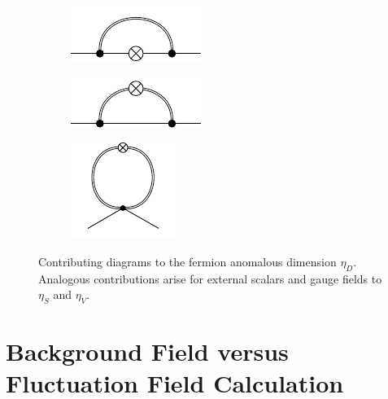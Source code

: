  
  \begin{figure}[t]
 \centering
 \hfill
 \begin{subfigure}{0.3\textwidth} 
	\includegraphics[width=\textwidth]{figs/TikZ/graviton_fluctuations1}
 \end{subfigure}
 \hfill
 \begin{subfigure}{0.3\textwidth}
 \vspace{-3.5pt}
 	\includegraphics[width=\textwidth]{figs/TikZ/graviton_fluctuations2}
 \end{subfigure} 
 \hfill
 \begin{subfigure}{0.3\textwidth} 
 	\includegraphics[scale = 1.5]{figs/TikZ/graviton_fluctuations3}
 \end{subfigure} 
 \hfill
 \caption[Contributing diagrams to the fermion anomalous dimension $\eta_D$.]{Contributing diagrams to the fermion anomalous dimension $\eta_D$. Analogous contributions arise for external scalars and gauge fields to $\eta_S$ and $\eta_V$.} 	
 \end{figure}
 
 \section{Background Field versus Fluctuation Field Calculation}

 